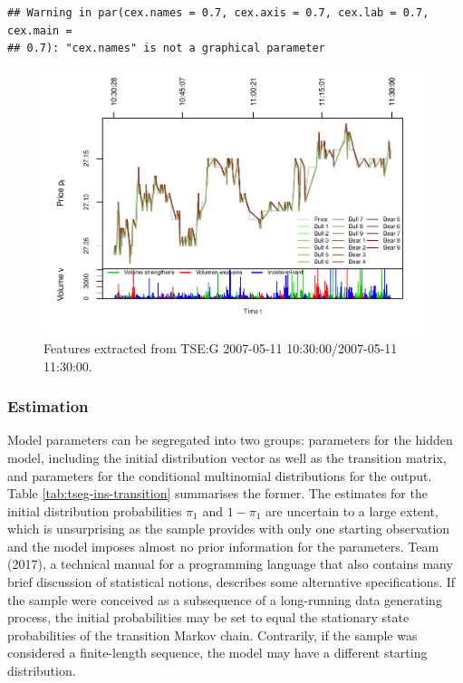 \documentclass[]{article}
\begin{document}
\begin{verbatim}
## Warning in par(cex.names = 0.7, cex.axis = 0.7, cex.lab = 0.7, cex.main =
## 0.7): "cex.names" is not a graphical parameter
\end{verbatim}

\begin{figure}[H]
\includegraphics[width=\textwidth]{main_files/figure-latex/unnamed-chunk-8-1} \caption{Features extracted from TSE:G 2007-05-11 10:30:00/2007-05-11 11:30:00. \label{tseg-ins-features}}\label{fig:unnamed-chunk-8}
\end{figure}

\subsubsection{Estimation}\label{estimation}

Model parameters can be segregated into two groups: parameters for the
hidden model, including the initial distribution vector as well as the
transition matrix, and parameters for the conditional multinomial
distributions for the output. Table \ref{tab:tseg-ins-transition}
summarises the former. The estimates for the initial distribution
probabilities \(\pi_1\) and \(1 - \pi_1\) are uncertain to a large
extent, which is unsurprising as the sample provides with only one
starting observation and the model imposes almost no prior information
for the parameters. Team (2017), a technical manual for a programming
language that also contains many brief discussion of statistical
notions, describes some alternative specifications. If the sample were
conceived as a subsequence of a long-running data generating process,
the initial probabilities may be set to equal the stationary state
probabilities of the transition Markov chain. Contrarily, if the sample
was considered a finite-length sequence, the model may have a different
starting distribution.
\end{document}
